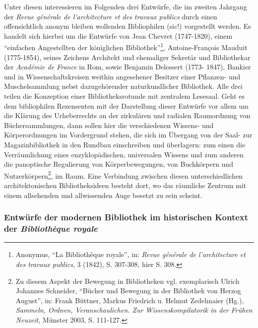 Unter diesen interessieren im Folgenden drei Entwürfe, die im zweiten
Jahrgang der \emph{Revue générale de l'architecture et des travaux
publics} durch einen offensichtlich anonym bleiben wollenden
Bibliophilen (sic!) vorgestellt werden. Es handelt sich hierbei um die
Entwürfe von Jean Chevret (1747-1820), einem \enquote{einfachen
Angestellten der königlichen Bibliothek}\footnote{Anonymus, \enquote{La
  Bibliothèque royale}, in: \emph{Revue générale de l'architecture et
  des travaux publics}, 3 (1842), S. 307-308, hier S. 308.},
Antoine-François Mauduit (1775-1854), seines Zeichens Architekt und
ehemaliger Sekretär und Bibliothekar der \emph{Académie de France} in
Rom, sowie Benjamin Delessert (1773- 1847), Bankier und in
Wissenschaftskreisen weithin angesehener Besitzer einer Pflanzen- und
Muschelsammlung nebst dazugehörender naturkundlicher Bibliothek. Alle
drei teilen die Konzeption einer Bibliotheksrotunde mit zentralem
Lesesaal. Geht es dem bibliophilen Rezensenten mit der Darstellung
dieser Entwürfe vor allem um die Klärung des Urheberrechts an der
zirkulären und radialen Raumordnung von Büchersammlungen, dann sollen
hier die verschiedenen Wissens- und Körperordnungen im Vordergrund
stehen, die sich im Übergang von der Saal- zur Magazinbibliothek in den
Rundbau einschreiben und überlagern: zum einen die Verräumlichung eines
enzyklopädischen, universalen Wissens und zum anderen die panoptische
Regulierung von Körperbewegungen, von Buchkörpern und
Nutzerkörpern\footnote{Zu diesem Aspekt der Bewegung in Bibliotheken
  vgl. exemplarisch Ulrich Johannes Schneider, \enquote{Bücher und
  Bewegung in der Bibliothek von Herzog August}, in: Frank Büttner,
  Markus Friedrich u. Helmut Zedelmaier (Hg.), \emph{Sammeln, Ordnen,
  Veranschaulichen. Zur Wissenskompilatorik in der Frühen Neuzeit},
  Münster 2003, S. 111-127.}, im Raum. Eine Verbindung zwischen diesen
unterschiedlichen architektonischen Bibliotheksideen besteht dort, wo
das räumliche Zentrum mit einem allsehenden und allwissenden Auge
besetzt zu sein scheint.

\subsubsection{\texorpdfstring{Entwürfe der modernen Bibliothek im
historischen Kontext der \emph{Bibliothèque
royale}}{Entwürfe der modernen Bibliothek im historischen Kontext der Bibliothèque royale}}\label{entwuxfcrfe-der-modernen-bibliothek-im-historischen-kontext-der-bibliothuxe8que-royale}

